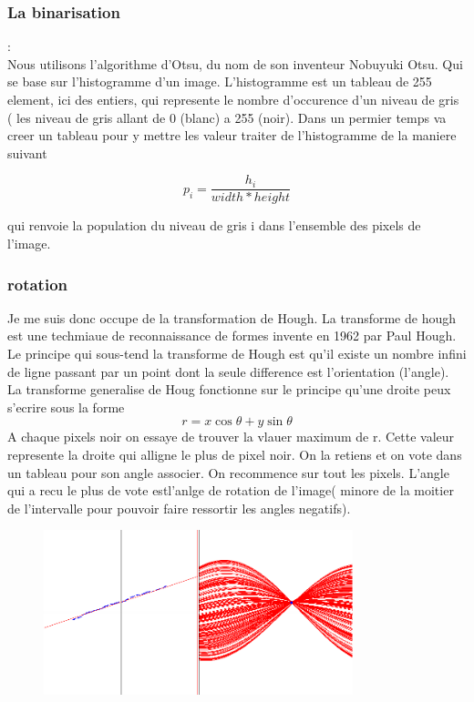 \documentclass{article}
\begin{document}
\subsubsection{La binarisation}
:\\
Nous utilisons l'algorithme d'Otsu, du nom de son inventeur Nobuyuki Otsu. Qui se base sur l'histogramme d'un image. L'histogramme est un tableau de 255 element, ici des entiers, qui represente le nombre d'occurence d'un niveau de gris ( les niveau de gris allant de 0 (blanc) a 255 (noir). Dans un permier temps va creer un tableau pour y mettre les valeur traiter de l'histogramme de la maniere suivant 
\begin{center}
\[ p_{i} = \frac{h_{i}} {width * height}\]
\end{center}
qui renvoie la population du niveau de gris i dans l'ensemble des pixels de l'image.
\subsubsection{rotation}
Je me suis donc occupe de la transformation de Hough. La transforme de hough est une techmiaue de reconnaissance de formes invente en 1962 par Paul Hough.
Le principe qui sous-tend la transforme de Hough est qu'il existe un nombre infini de ligne passant par un point dont la seule difference est l'orientation (l'angle). La transforme generalise de Houg fonctionne sur le principe qu'une droite peux s'ecrire sous la forme 
\[r = x\cos{\theta}+y\sin{\theta}\]
A chaque pixels noir on essaye de trouver la vlauer maximum de r. Cette valeur represente la droite qui alligne le plus de pixel noir. On la retiens et on vote dans un tableau pour son angle associer. On recommence sur tout les pixels. L'angle qui a recu le plus de vote estl'anlge de rotation de l'image( minore de la moitier de l'intervalle pour pouvoir faire ressortir les angles negatifs). 
\begin{figure}[hp]
\centering
\includegraphics[width=0.80\textwidth]{img/hough.png}
\end{figure}
\end{document}
